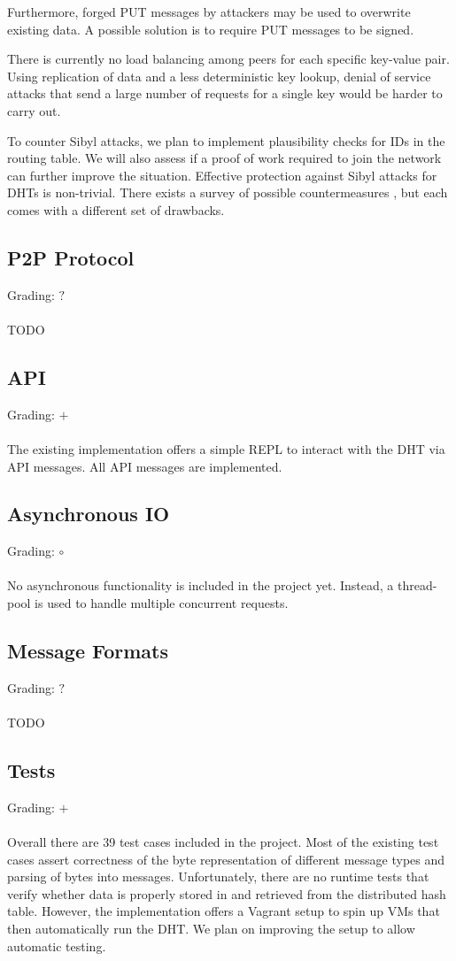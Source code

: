 \documentclass[a4paper, 11pt]{article}
\begin{document}
Furthermore, forged PUT messages by attackers may be used to overwrite existing data.
A possible solution is to require PUT messages to be signed.

There is currently no load balancing among peers for each specific key-value pair. 
Using replication of data and a less deterministic key lookup, denial of service attacks that send a large number of requests for a single key would be harder to carry out.

To counter Sibyl attacks, we plan to implement plausibility checks for IDs in the routing table.
We will also assess if a proof of work required to join the network can further improve the situation.
Effective protection against Sibyl attacks for DHTs is non-trivial.
There exists a survey of possible countermeasures \cite{urdaneta2011survey}, but each comes with a different set of drawbacks.

\subsection*{P2P Protocol}
Grading: $?$\\
\\
TODO


\subsection*{API}
Grading: $+$\\
\\
The existing implementation offers a simple REPL to interact with the DHT via API messages.
All API messages are implemented.

\subsection*{Asynchronous IO}
Grading: $\circ$\\
\\
No asynchronous functionality is included in the project yet.
Instead, a thread-pool is used to handle multiple concurrent requests.


\subsection*{Message Formats}
Grading: $?$\\
\\
TODO


\subsection*{Tests}
Grading: $+$\\
\\
Overall there are 39 test cases included in the project.
Most of the existing test cases assert correctness of the byte representation of different message types and parsing of bytes into messages.
Unfortunately, there are no runtime tests that verify whether data is properly stored in and retrieved from the distributed hash table.
However, the implementation offers a Vagrant setup to spin up VMs that then automatically run the DHT.
We plan on improving the setup to allow automatic testing.
\end{document}
